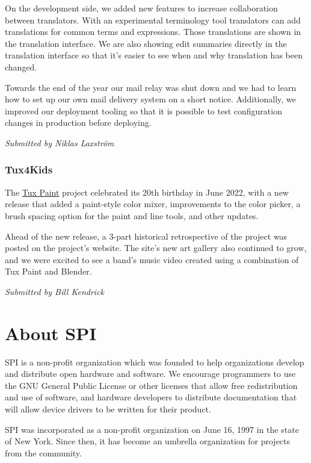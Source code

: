 \documentclass[a4paper]{report}
\begin{document}
On the development side, we added new features to increase collaboration between translators. With an experimental terminology tool translators can add translations for common terms and expressions. Those translations are shown in the translation interface. We are also showing edit summaries
directly in the translation interface so that it's easier to see when and why translation has been changed.

Towards the end of the year our mail relay was shut down and we had to learn how to set up our own mail delivery system on a short notice.  Additionally, we improved our deployment tooling so that it is possible to test configuration changes in production before deploying.

{\em Submitted by Niklas Laxström}

\subsection{Tux4Kids}

The \href{https://tuxpaint.org/}{Tux Paint} project celebrated its 20th birthday in June 2022, with a new release that added a paint-style color mixer, improvements to the color picker, a brush spacing option for the paint and line tools, and other updates.

Ahead of the new release, a 3-part historical retrospective of the project was posted on the project's website.  The site's new art gallery also continued to grow, and we were excited to see a band's music video created using a combination of Tux Paint and Blender.

{\em Submitted by Bill Kendrick}


\appendix
\chapter{About SPI}

SPI is a non-profit organization which was founded to help organizations develop and distribute open hardware and software. We encourage programmers to use the GNU General Public License or other licenses that allow free redistribution and use of software, and hardware developers to distribute documentation that will allow device drivers to be written for their product.

SPI was incorporated as a non-profit organization on June 16, 1997 in the state of New York. Since then, it has become an umbrella organization for projects from the community.
\end{document}
